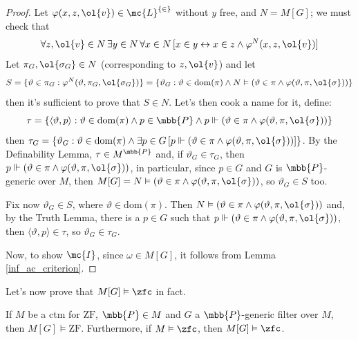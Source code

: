 \begin{proof}
    Let $\varphi(x,z,\ol{v})\in\mc{L}^{\{\in\}}$ without $y$ free, and $N=M[G]$; we must check that
    $$\forall z,\ol{v}\in N\,\exists y\in N\,\forall x\in N\,[x\in y\leftrightarrow x\in z\wedge\varphi^N(x,z,\ol{v})]$$
    Let $\pi_G,\ol{\sigma_G}\in N$ (corresponding to $z,\ol{v}$) and let 
    $$S=\{\vartheta\in\pi_G:\varphi^N(\vartheta,\pi_G,\ol{\sigma_G})\}=\{\vartheta_G:\vartheta\in\text{dom}(\pi)\wedge N\vDash(\vartheta\in\pi\wedge\varphi(\vartheta,\pi,\ol{\sigma}))\}$$
    then it's sufficient to prove that $S\in N$. Let's then cook a name for it, define:
    $$\tau=\{\langle\vartheta,p\rangle:\vartheta\in\text{dom}(\pi)\wedge p\in\mbb{P}\wedge p\Vdash(\vartheta\in\pi\wedge\varphi(\vartheta,\pi,\ol{\sigma}))\}$$
    then $\tau_G=\{\vartheta_G:\vartheta\in\text{dom}(\pi)\wedge\exists p\in G\,[p\Vdash(\vartheta\in\pi\wedge\varphi(\vartheta,\pi,\ol{\sigma}))]\}$. By the Definability Lemma, $\tau\in M^{\mbb{P}}$ and, if $\vartheta_G\in\tau_G$, then $p\Vdash(\vartheta\in\pi\wedge\varphi(\vartheta,\pi,\ol{\sigma}))$, in particular, since $p\in G$ and $G$ is $\mbb{P}$-generic over $M$, then $M[G]=N\vDash(\vartheta\in\pi\wedge\varphi(\vartheta,\pi,\ol{\sigma}))$, so $\vartheta_G\in S$ too.

    Fix now $\vartheta_G\in S$, where $\vartheta\in\text{dom}(\pi)$. Then $N\vDash(\vartheta\in\pi\wedge\varphi(\vartheta,\pi,\ol{\sigma}))$ and, by the Truth Lemma, there is a $p\in G$ such that $p\Vdash(\vartheta\in\pi\wedge\varphi(\vartheta,\pi,\ol{\sigma}))$, then $\langle\vartheta,p\rangle\in\tau$, so $\vartheta_G\in\tau_G$.

    Now, to show $\mc{I}$, since $\omega\in M[G]$, it follows from Lemma \ref{inf_ac_criterion}.
\end{proof}

Let's now prove that $M[G]\vDash\zfc$ in fact.

\begin{theorem}{}{}
    If $M$ be a ctm for $\text{ZF}$, $\mbb{P}\in M$ and $G$ a $\mbb{P}$-generic filter over $M$, then $M[G]\vDash\text{ZF}$. Furthermore, if $M\vDash\zfc$, then $M[G]\vDash\zfc$.
\end{theorem}

